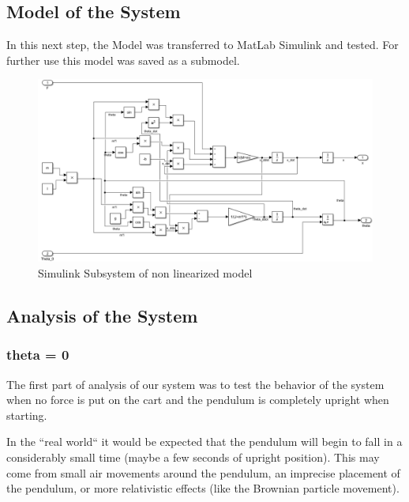 \subsection{Model of the System}
In this next step, the Model was transferred to MatLab Simulink and tested. For further use this model was saved as a submodel.
\begin{figure}[H]
    \centering
    \includegraphics[width=1.2\textwidth]{Lab_report/pics/modelBuilding/non_linearized_model.PNG}
    \caption{Simulink Subsystem of non linearized model}
    \label{fig:non_linearized_model}
\end{figure}
\subsection{Analysis of the System}
\label{ssec:Analysis_of_non_lin_system}
\subsubsection{theta = 0}
The first part of analysis of our system was to test the behavior of the system when no force is put on the cart and the pendulum is completely upright when starting.

In the ``real world`` it would be expected that the pendulum will begin to fall in a considerably small time (maybe a few seconds of upright position). This may come from small air movements around the pendulum, an imprecise placement of the pendulum, or more relativistic effects (like the Brownian particle movement). 

